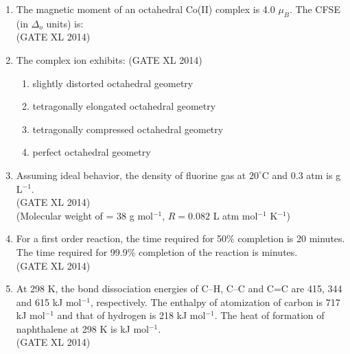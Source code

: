 \documentclass[journal,12pt,onecolumn]{IEEEtran}
\theoremstyle{remark}
\begin{document}
\begin{enumerate}
  \item The magnetic moment of an octahedral Co(II) complex is 4.0 $\mu_B$. The CFSE (in $\Delta_o$ units) is:\\
  \hfill (GATE XL 2014)\\

  \item The complex ion  exhibits:    \hfill (GATE XL 2014)\\
  \begin{multicols}{2}
  \begin{enumerate}
    \item slightly distorted octahedral geometry
    \item tetragonally elongated octahedral geometry
    \item tetragonally compressed octahedral geometry
    \item perfect octahedral geometry
  \end{enumerate}
  \end{multicols}

\item Assuming ideal behavior, the density of fluorine gas at $20^\circ$C and 0.3 atm is \underline{\hspace{2cm}} g L$^{-1}$. \\
\hfill (GATE XL 2014)\\
(Molecular weight of  = 38 g mol$^{-1}$, $R=0.082$ L atm mol$^{-1}$ K$^{-1}$)\\

\item For a first order reaction, the time required for 50\% completion is 20 minutes. The time required for 99.9\% completion of the reaction is \underline{\hspace{2cm}} minutes.\\
\hfill (GATE XL 2014)\\

\item At 298 K, the bond dissociation energies of C--H, C--C and C=C are 415, 344 and 615 kJ mol$^{-1}$, respectively. The enthalpy of atomization of carbon is 717 kJ mol$^{-1}$ and that of hydrogen is 218 kJ mol$^{-1}$. The heat of formation of naphthalene at 298 K is \underline{\hspace{2cm}} kJ mol$^{-1}$.\\
\hfill (GATE XL 2014)\\


\end{enumerate}
\end{document}
